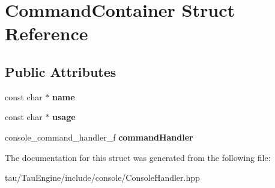 \hypertarget{struct_command_container}{}\section{Command\+Container Struct Reference}
\label{struct_command_container}
\subsection*{Public Attributes}
\begin{DoxyCompactItemize}
\item 
\mbox{\label{struct_command_container_a84f2aa3cdde79b85ef71a8cea188cd59}} 
const char $\ast$ {\bfseries name}
\item 
\mbox{\label{struct_command_container_a4705324e1cf3c85920a7d02ced48d2ba}} 
const char $\ast$ {\bfseries usage}
\item 
\mbox{\label{struct_command_container_ad9e6e1bcd9c4eab9c7b54889ed6847a0}} 
console\+\_\+command\+\_\+handler\+\_\+f {\bfseries command\+Handler}
\end{DoxyCompactItemize}


The documentation for this struct was generated from the following file\+:\begin{DoxyCompactItemize}
\item 
tau/\+Tau\+Engine/include/console/Console\+Handler.\+hpp\end{DoxyCompactItemize}
